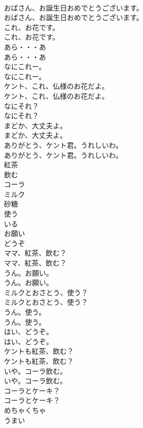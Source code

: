 \documentclass[8pt]{extreport}
\begin{document}
\begin{CJK}{UTF8}{min}
\\	おばさん、お誕生日おめでとうございます。	
\\	おばさん、お誕生日おめでとうございます。 
\\	これ、お花です。	
\\	これ、お花です。 
\\	あら・・・あ	
\\	あら・・・あ 
\\	なにこれー。	
\\	なにこれー。 
\\	ケント、これ、仏様のお花だよ。	
\\	ケント、これ、仏様のお花だよ。 
\\	なにそれ？	
\\	なにそれ？ 
\\	まどか、大丈夫よ。	
\\	まどか、大丈夫よ。 
\\	ありがとう、ケント君。うれしいわ。	
\\	ありがとう、ケント君。うれしいわ。 
\\	紅茶
\\	飲む
\\	コーラ
\\	ミルク
\\	砂糖
\\	使う
\\	いる
\\	お願い
\\	どうぞ
\\	ママ、紅茶、飲む？	
\\	ママ、紅茶、飲む？ 
\\	うん。お願い。	
\\	うん。お願い。 
\\	ミルクとおさとう、使う？	
\\	ミルクとおさとう、使う？ 
\\	うん。使う。	
\\	うん。使う。 
\\	はい、どうぞ。	
\\	はい、どうぞ。 
\\	ケントも紅茶、飲む？	
\\	ケントも紅茶、飲む？ 
\\	いや。コーラ飲む。	
\\	いや。コーラ飲む。 
\\	コーラとケーキ？	
\\	コーラとケーキ？ 
\\	めちゃくちゃ
\\	うまい

\end{CJK}
\end{document}
